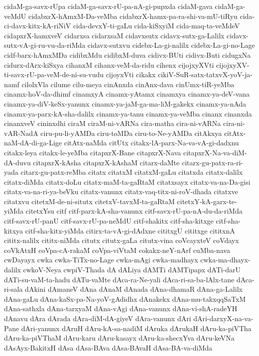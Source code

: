 {cidaM-ga-savx-rUpa
cidaM-ga-savx-rU-pa-nA-gi-pupxda
cidaM-gava
cidaM-ga-veMdU
cidabxrX-hAmxM-Da-veMba
cidabxrX-hamx-pa-ra-shi-va-mU-tiRyu
cida-ci-davx-kitx-kA-riNiV
cida-devxY-ti-gaLu
cida-kiSxyiM
cida-maq-ta-veMdeV
cidapxrX-hamxveV
cidarxsa
cidarxsaM
cidavxsutx
cidavx-sutx-ga-Lalilx
cidavx-sutx-vA-gi-ru-vu-da-riMda
cidavx-sutxvu
cidebx-La-gi-nalilx
cidebx-La-gi-no-Lage
cidf-barx-hAmxMDa
cidibxMdu
cidibxM-duva
cidivx-BUti
cidivx-Buti
cidugxNa
cidurx-dArx-kiSxya
cihanxM
cihanx-veM-da-ridu
cihenx
cijojxyXVti
cijojxyXV-ti-savx-rU-pa-veM-de-ni-su-vudu
cijoyxVti
cikakx
cikiV-SuR-satx-tatxvX-yoV-ja-namf
cilolxVla
cilume
cilu-meya
cinAnxda
cinAnx-dava
cinUmx-tiR-yeMba
cinamx-hoV-da-dhimf
cinamxyA
cinamx-yAtamx
cinamxya
cinamx-ya-deV-vana
cinamx-ya-diV-keSx-yanunx
cinamx-ya-jaM-ga-ma-liM-gakekx
cinamx-ya-nAda
cinamx-ya-parx-kA-sha-dalilx
cinamx-ya-tanu
cinamx-ya-veMba
cinanx
cinanxda
cinanxveV
cininxdhi
ciraM
ciraM-ni-vARNa
cira-matha
cira-ni-vARNa
cira-ni-vAR-NadA
ciru-pu-li-yAMDa
ciru-toMDa
ciru-to-Ne-yAMDa
citAkxya
citAtx-naM-dA-di-ga-Lige
citAtx-naMda
citUtx
citakx-lA-parx-Na-va-vA-gi-dadxnu
citakx-leya
citakx-le-yeMba
citapxrX-Bane
citapxrX-Nava
citapxrX-Na-va-diM-dA-duvu
citapxrX-kAsha
citapxrX-kAshaM
citarx-daMte
citarx-gu-patx-ra-ri-yada
citarx-gu-patx-reMba
citatx
citatxM
citatxM-gaLu
citatxda
citatx-dalilx
citatx-diMda
citatx-doLu
citatx-maM-ta-gaRtaM
citatxsayx
citatx-va-na-Da-gisi
citatx-va-na-ri-ya-beVku
citatx-vanunx
citatx-vaq-titx-ni-roV-dhada
citatxve
citatxvu
citetxM-de-ni-situtx
citetxV-tavxM-ta-gaRtaM
citetxY-kA-garx-te-yiMda
citetxYsu
citf
citf-parx-kA-sha-vanunx
citf-savx-rU-pa-nA-du-da-riMda
citf-savx-rU-panU
citf-savx-rU-pa-neMdU
citf-shakitx
citf-sha-kitxge
citf-sha-kitxya
citf-sha-kitx-yiMda
citirx-ta-vA-gi-dAdxne
cititxgU
cititxge
cititxnA
cititx-nalilx
cititx-niMda
citutx
citutx-gaLa
citutx-vina
coVcayxteV
coVdayx
coVkAtxH
coVpa-cA-rakaM
coVpa-viVtaM
cokakx-neY-nArf
cuMba-nava
cwDayayx
cwka
cwka-TiTx-no-Lage
cwka-mAgi
cwka-madhayx
cwka-ma-dhayx-dalilx
cwkoV-Neya
cwpiV-Thada
dA
dALiya
dAMTi
dAMTipapx
dATi-darU
dATi-su-vaM-ta-hadu
dATu-vaMte
dAca-ra-Ne-yali
dAca-ri-sa-ba-lAlx-tane
dAca-ri-sala
dAkini
dAmaneV
dAna
dAnaM
dAnada
dAna-dhamaR
dAna-ga-Lalilx
dAna-gaLu
dAna-kaSx-pa-Na-yoV-gAdidhx
dAnakekx
dAna-mu-takxqqSaTxM
dAna-sathxla
dAna-tarxyaM
dAna-vAgi
dAna-vanunx
dAna-vi-shA-radeYH
dAnavu
dAra
dArada
dAra-diM-dA-giyeV
dAra-vanunx
dAri
dAri-darxyX-na-va-Pane
dAri-yanunx
dAruH
dAru-kA-sa-nadiM
dAruka
dArukaH
dAru-ka-piVTha
dAru-ka-piVThaM
dAru-karu
dAru-kasayx
dAru-ka-shecxYva
dAru-keVNa
dAsAyx-BakitxH
dAsa
dAsa-BAva
dAsa-BAvaH
dAsa-BA-va-diMda
}
